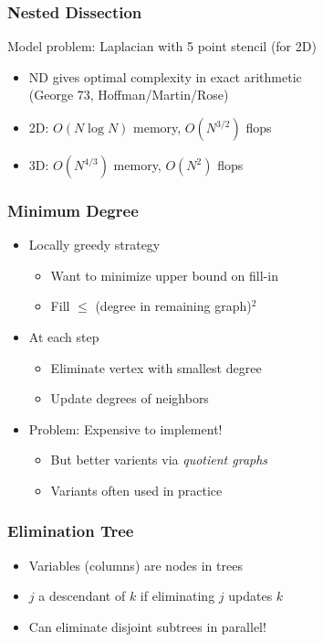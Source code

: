 \documentclass{beamer}
\begin{document}
\begin{frame}
  \frametitle{Nested Dissection}

  Model problem: Laplacian with 5 point stencil (for 2D)
  \begin{itemize}
  \item
    ND gives optimal complexity in exact arithmetic \\
    (George 73, Hoffman/Martin/Rose)
  \item 2D: $O(N \log N)$ memory, $O(N^{3/2})$ flops
  \item 3D: $O(N^{4/3})$ memory, $O(N^2)$ flops
  \end{itemize}
\end{frame}

\begin{frame}
  \frametitle{Minimum Degree}
  
  \begin{itemize}
  \item Locally greedy strategy
    \begin{itemize}
    \item Want to minimize upper bound on fill-in
    \item Fill $\leq$ (degree in remaining graph)$^2$
    \end{itemize}
  \item At each step
    \begin{itemize}
    \item Eliminate vertex with smallest degree
    \item Update degrees of neighbors
    \end{itemize}
  \item Problem: Expensive to implement!
    \begin{itemize}
    \item But better varients via {\em quotient graphs}
    \item Variants often used in practice
    \end{itemize}
  \end{itemize}
\end{frame}


\begin{frame}
  \frametitle{Elimination Tree}

  \begin{itemize}
  \item Variables (columns) are nodes in trees
  \item $j$ a descendant of $k$ if eliminating $j$ updates $k$
  \item Can eliminate disjoint subtrees in parallel!
  \end{itemize}
\end{frame}
\end{document}
